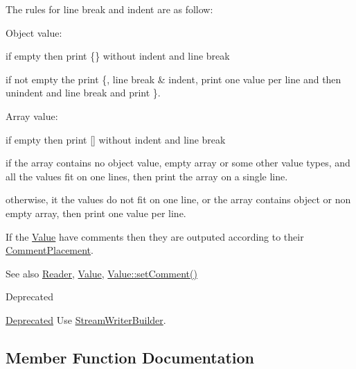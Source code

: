 The rules for line break and indent are as follow\+:
\begin{DoxyItemize}
\item Object value\+:
\begin{DoxyItemize}
\item if empty then print \{\} without indent and line break
\item if not empty the print \textquotesingle{}\{\textquotesingle{}, line break \& indent, print one value per line and then unindent and line break and print \textquotesingle{}\}\textquotesingle{}.
\end{DoxyItemize}
\item Array value\+:
\begin{DoxyItemize}
\item if empty then print \mbox{[}\mbox{]} without indent and line break
\item if the array contains no object value, empty array or some other value types, and all the values fit on one lines, then print the array on a single line.
\item otherwise, it the values do not fit on one line, or the array contains object or non empty array, then print one value per line.
\end{DoxyItemize}
\end{DoxyItemize}

If the \hyperlink{class_json_1_1_value}{Value} have comments then they are outputed according to their \hyperlink{namespace_json_a4fc417c23905b2ae9e2c47d197a45351}{Comment\+Placement}.

\begin{DoxySeeAlso}{See also}
\hyperlink{class_json_1_1_reader}{Reader}, \hyperlink{class_json_1_1_value}{Value}, \hyperlink{class_json_1_1_value_a29f3a30f7e5d3af6f38d57999bf5b480}{Value\+::set\+Comment()} 
\end{DoxySeeAlso}
\begin{DoxyRefDesc}{Deprecated}
\item[\hyperlink{deprecated__deprecated000009}{Deprecated}]Use \hyperlink{class_json_1_1_stream_writer_builder}{Stream\+Writer\+Builder}. \end{DoxyRefDesc}


\subsection{Member Function Documentation}
\hypertarget{class_json_1_1_styled_writer_a56f0fd80f60272b3f3c85690aae66e7d}{}
